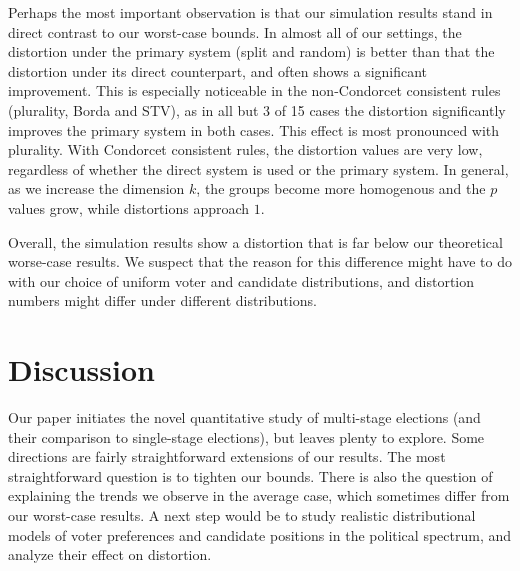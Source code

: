 \documentclass[letterpaper]{article} %
\theoremstyle{definition}
\begin{document}
Perhaps the most important observation is that our simulation results stand in direct contrast to our worst-case bounds. In almost all of our settings, the distortion under the primary system (split and random) is better than that the distortion under its direct counterpart, and often shows a significant improvement. This is especially noticeable in the non-Condorcet consistent rules (plurality, Borda and STV), as in all but 3 of 15 cases the distortion significantly improves the primary system in both cases. This effect is most pronounced with plurality. With Condorcet consistent rules, the distortion values are very low, regardless of whether the direct system is used or the primary system. In general, as we increase the dimension $k$, the groups become more homogenous and the $p$ values grow, while distortions  approach $1$.

Overall, the simulation results show a distortion that is far below our theoretical worse-case results. We suspect that the reason for this difference might have to do with our choice of uniform voter and candidate distributions, and distortion numbers might differ under different distributions.

\section{Discussion}



Our paper initiates the novel quantitative study of multi-stage elections (and their comparison to single-stage elections), but leaves plenty to explore. Some directions are fairly straightforward extensions of our results. The most straightforward question is to tighten our bounds. There is also the question of explaining the trends we observe in the average case, which sometimes differ from our worst-case results. A next step would be to study realistic distributional models of voter preferences and candidate positions in the political spectrum, and analyze their effect on distortion.
\end{document}

